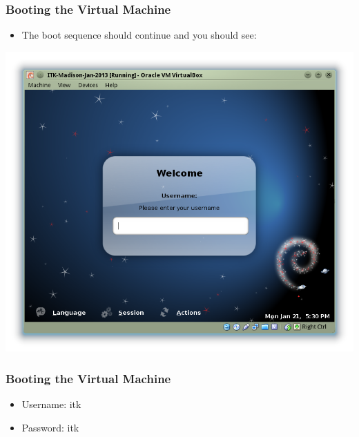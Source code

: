 \begin{frame}
\frametitle{Booting the Virtual Machine}
\begin{itemize}
\item The boot sequence should continue and you should see:
\end{itemize}
\begin{center}
  \includegraphics[width=0.7\paperwidth]{../Art/Screenshot-ITKv4-VirtualBox-01.png}
\end{center}
\end{frame}

\begin{frame}
\frametitle{Booting the Virtual Machine}
\begin{itemize}
\item Username: itk
\item Password: itk
\end{itemize}
\end{frame}




